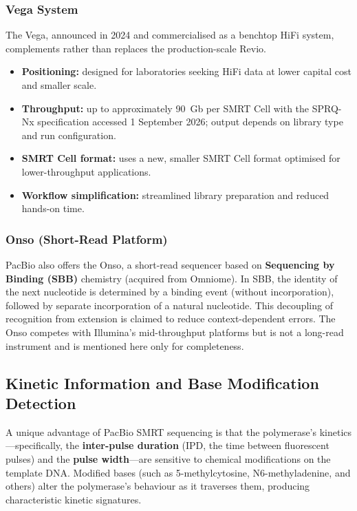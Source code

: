 \subsubsection{Vega System}

The Vega, announced in 2024 and commercialised as a benchtop HiFi system, complements rather than replaces the production-scale Revio.

\begin{itemize}[nosep]
  \item \textbf{Positioning:} designed for laboratories seeking HiFi data at lower capital cost and smaller scale.
  \item \textbf{Throughput:} up to approximately 90~Gb per SMRT Cell with the SPRQ-Nx specification accessed 1 September 2026; output depends on library type and run configuration.
  \item \textbf{SMRT Cell format:} uses a new, smaller SMRT Cell format optimised for lower-throughput applications.
  \item \textbf{Workflow simplification:} streamlined library preparation and reduced hands-on time.
\end{itemize}

\subsubsection{Onso (Short-Read Platform)}

PacBio also offers the Onso, a short-read sequencer based on \textbf{Sequencing by Binding (SBB)} chemistry (acquired from Omniome). In SBB, the identity of the next nucleotide is determined by a binding event (without incorporation), followed by separate incorporation of a natural nucleotide. This decoupling of recognition from extension is claimed to reduce context-dependent errors. The Onso competes with Illumina's mid-throughput platforms but is not a long-read instrument and is mentioned here only for completeness.

\subsection{Kinetic Information and Base Modification Detection}

A unique advantage of PacBio SMRT sequencing is that the polymerase's kinetics---specifically, the \textbf{inter-pulse duration} (IPD, the time between fluorescent pulses) and the \textbf{pulse width}---are sensitive to chemical modifications on the template DNA. Modified bases (such as 5-methylcytosine, N6-methyladenine, and others) alter the polymerase's behaviour as it traverses them, producing characteristic kinetic signatures.

